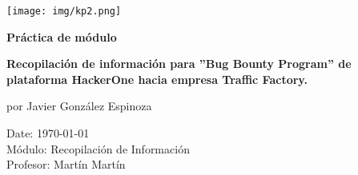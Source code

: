 \documentclass[12pt,oneside,a4paper]{book}
\makeatletter
\renewcommand{\headrulewidth}{0.2pt}
\renewcommand\tableofcontents{%
    \if@twocolumn
      \@restonecoltrue\onecolumn
    \else
      \@restonecolfalse
    \fi
    \section*{\contentsname
        \@mkboth{%
           \MakeUppercase\contentsname}{\MakeUppercase\contentsname}}%
    \@starttoc{toc}%
    \if@restonecol\twocolumn\fi
    }
\makeatother
\begin{document}
\renewcommand{\headrulewidth}{0pt}








\begin{titlepage}
   \thispagestyle{fancy}
   \begin{center}
        \vspace{5em}
   
        \centering\texttt{[image: img/kp2.png]}

        \vspace{5em}

        \huge{\textbf{Práctica de módulo}}

        \vspace{2em}
        
        \huge{\textbf{Recopilación de información para ''Bug Bounty Program'' de plataforma HackerOne hacia empresa Traffic Factory. \\}}
        
        \vspace{5em}

        \Large{por Javier González Espinoza}

        \vspace{6em}
        
   \end{center}

    \normalsize{Date: \today \\
     Módulo: Recopilación de Información \\
     Profesor: Martín Martín}
    
\end{titlepage}

\renewcommand{\headrulewidth}{0.2pt}

\newpage

\tableofcontents

\newpage







\end{document}
